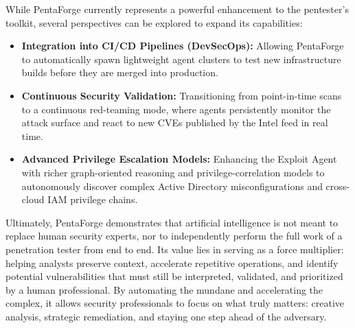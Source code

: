 \documentclass[12pt,a4paper]{report}
\begin{document}
While PentaForge currently represents a powerful enhancement to the pentester's toolkit, 
several perspectives can be explored to expand its capabilities:
\begin{itemize}
    \item \textbf{Integration into CI/CD Pipelines (DevSecOps):} Allowing PentaForge to 
    automatically spawn lightweight agent clusters to test new infrastructure builds 
    before they are merged into production.
    \item \textbf{Continuous Security Validation:} Transitioning from point-in-time scans 
    to a continuous red-teaming mode, where agents persistently monitor the attack surface 
    and react to new CVEs published by the Intel feed in real time.
    \item \textbf{Advanced Privilege Escalation Models:} Enhancing the Exploit Agent
    with richer graph-oriented reasoning and privilege-correlation models to
    autonomously discover complex Active Directory misconfigurations and cross-cloud
    IAM privilege chains.
\end{itemize}

Ultimately, PentaForge demonstrates that artificial intelligence is not meant to replace 
human security experts, nor to independently perform the full work of a penetration 
tester from end to end. Its value lies in serving as a force multiplier: helping 
analysts preserve context, accelerate repetitive operations, and identify potential 
vulnerabilities that must still be interpreted, validated, and prioritized by a human 
professional. By automating the mundane and accelerating the complex, it allows security 
professionals to focus on what truly matters: creative analysis, strategic remediation, 
and staying one step ahead of the adversary.
\end{document}
